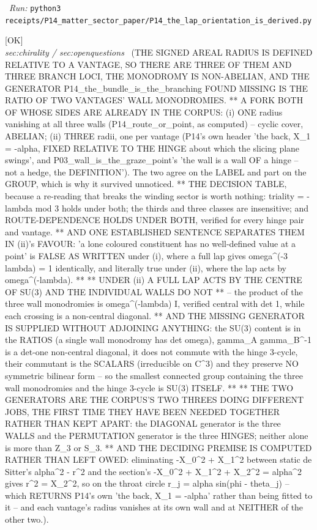 \begin{description}
\ \emph{Run:} \texttt{python3 receipts/P14\_matter\_sector\_paper/P14\_the\_lap\_orientation\_is\_derived.py}
\item[\rcptlabel{P14_the_wall_is_a_wall_of_a_hinge}{P14R28}\textbf{P14R28}\quad\texttt{P14\_the\_wall\_is\_a\_wall\_of\_a\_hinge}]\hfill\textsf{[OK]}\\
\textit{sec:chirality / sec:openquestions} \ (THE SIGNED AREAL RADIUS IS DEFINED RELATIVE TO A VANTAGE, SO THERE ARE THREE OF THEM AND THREE BRANCH LOCI, THE MONODROMY IS NON-ABELIAN, AND THE GENERATOR P14\_the\_bundle\_is\_the\_branching FOUND MISSING IS THE RATIO OF TWO VANTAGES' WALL MONODROMIES. ** A FORK BOTH OF WHOSE SIDES ARE ALREADY IN THE CORPUS: (i) ONE radius vanishing at all three walls (P14\_route\_or\_point, as computed) -- cyclic cover, ABELIAN; (ii) THREE radii, one per vantage (P14's own header 'the back, X\_1 = -alpha, FIXED RELATIVE TO THE HINGE about which the slicing plane swings', and P03\_wall\_is\_the\_graze\_point's 'the wall is a wall OF a hinge -- not a hedge, the DEFINITION'). The two agree on the LABEL and part on the GROUP, which is why it survived unnoticed. ** THE DECISION TABLE, because a re-reading that breaks the winding sector is worth nothing: triality = -lambda mod 3 holds under both; the thirds and three classes are insensitive; and ROUTE-DEPENDENCE HOLDS UNDER BOTH, verified for every hinge pair and vantage. ** AND ONE ESTABLISHED SENTENCE SEPARATES THEM IN (ii)'s FAVOUR: 'a lone coloured constituent has no well-defined value at a point' is FALSE AS WRITTEN under (i), where a full lap gives omega\textasciicircum{}(-3 lambda) = 1 identically, and literally true under (ii), where the lap acts by omega\textasciicircum{}(-lambda). ** ** UNDER (ii) A FULL LAP ACTS BY THE CENTRE OF SU(3) AND THE INDIVIDUAL WALLS DO NOT ** -- the product of the three wall monodromies is omega\textasciicircum{}(-lambda) I, verified central with det 1, while each crossing is a non-central diagonal. ** AND THE MISSING GENERATOR IS SUPPLIED WITHOUT ADJOINING ANYTHING: the SU(3) content is in the RATIOS (a single wall monodromy has det omega), gamma\_A gamma\_B\textasciicircum{}-1 is a det-one non-central diagonal, it does not commute with the hinge 3-cycle, their commutant is the SCALARS (irreducible on C\textasciicircum{}3) and they preserve NO symmetric bilinear form -- so the smallest connected group containing the three wall monodromies and the hinge 3-cycle is SU(3) ITSELF. ** ** THE TWO GENERATORS ARE THE CORPUS'S TWO THREES DOING DIFFERENT JOBS, THE FIRST TIME THEY HAVE BEEN NEEDED TOGETHER RATHER THAN KEPT APART: the DIAGONAL generator is the three WALLS and the PERMUTATION generator is the three HINGES; neither alone is more than Z\_3 or S\_3. ** AND THE DECIDING PREMISE IS COMPUTED RATHER THAN LEFT OWED: eliminating -X\_0\textasciicircum{}2 + X\_1\textasciicircum{}2 between static de Sitter's alpha\textasciicircum{}2 - r\textasciicircum{}2 and the section's -X\_0\textasciicircum{}2 + X\_1\textasciicircum{}2 + X\_2\textasciicircum{}2 = alpha\textasciicircum{}2 gives r\textasciicircum{}2 = X\_2\textasciicircum{}2, so on the throat circle r\_j = alpha sin(phi - theta\_j) -- which RETURNS P14's own 'the back, X\_1 = -alpha' rather than being fitted to it -- and each vantage's radius vanishes at its own wall and at NEITHER of the other two.). 

\end{description}
